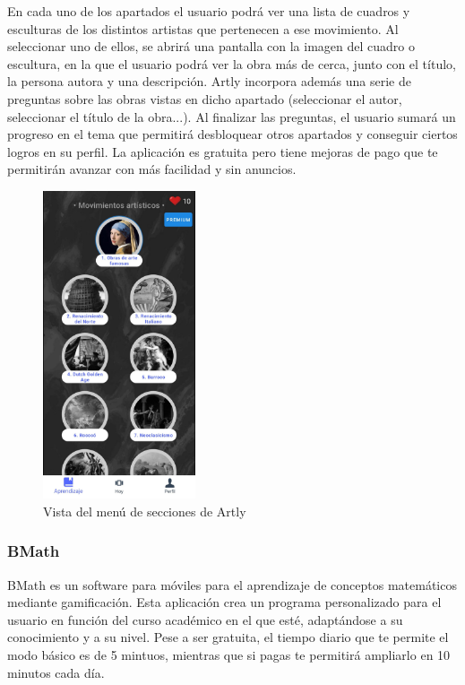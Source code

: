 En cada uno de los apartados el usuario podrá ver una lista de cuadros y esculturas de los distintos artistas que pertenecen a ese movimiento.
Al seleccionar uno de ellos, se abrirá una pantalla con la imagen del cuadro o escultura, en la que el usuario podrá ver la obra más de cerca, junto
con el título, la persona autora y una descripción. 
Artly incorpora además una serie de preguntas sobre las obras vistas en dicho apartado (seleccionar el autor, seleccionar el título de la obra...). 
Al finalizar las preguntas, el usuario sumará un progreso en el tema que permitirá desbloquear otros apartados y conseguir ciertos logros en su perfil.
La aplicación es gratuita pero tiene mejoras de pago que te permitirán avanzar con más facilidad y sin anuncios.

\begin{figure}[H]

    \centering
    \includegraphics[width=0.4\textwidth]{imagenes/c2/artly.jpeg}
    \caption{Vista del menú de secciones de Artly}
\end{figure}



\subsubsection{BMath}
BMath es un software para móviles para el aprendizaje de conceptos matemáticos mediante gamificación. Esta aplicación crea un programa personalizado para el
usuario en función del curso académico en el que esté, adaptándose a su conocimiento y a su nivel. Pese a ser gratuita, el tiempo diario que te permite el
modo básico es de 5 mintuos, mientras que si pagas te permitirá ampliarlo en 10 minutos cada día. 

